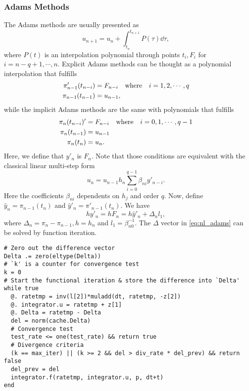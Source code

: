 \documentclass[11pt,a4paper]{article}
\begin{document}
\subsubsection{Adams Methods} \label{subsec:adams}
The Adams methods are usually presented as
\begin{equation} \label{eq:Adams_int}
  u_{n+1} = u_n + \int_{t_n}^{t_{n+1}} P(\tau) \dd{\tau},
\end{equation}
where $P(t)$ is an interpolation polynomial through points $t_i, F_i$ for
$i=n-q+1,\cdots,n$.
Explicit Adams methods can be thought as a polynomial interpolation that
fulfills
\begin{align} \label{eq:adams1}
  \pi_{n-1}'(t_{n-i})&=F_{n-i}\qq{where} i=1,2,\cdots,q \\
  \pi_{n-1}(t_{n-1})&=u_{n-1},
\end{align}
while the implicit Adams methods are the same with polynomials that fulfills
\begin{align} \label{eq:adams2}
  \pi_{n}(t_{n-i})'&=F_{n-i}\qq{where} i=0,1,\cdots,q-1 \\
  \pi_{n}(t_{n-1})&=u_{n-1} \\
  \pi_{n}(t_{n})&=u_{n}.
\end{align}
Here, we define that $y'_n$ is $F_n$. Note that those conditions are equivalent
with the classical linear multi-step form
\begin{equation}
  u_n = u_{n-1} h_n\sum_{i=0}^{q-1}\beta_{ni}y'_{n-i}.
\end{equation}
Here the coefficients $\beta_{ni}$ dependents on $h_j$ and order $q$. Now,
define $\hat{y}_n = \pi_{n-1}(t_n)$ and $\hat{y}'_n = \pi'_{n-1}(t_n)$. We have
\begin{equation} \label{eq:nl_adams}
  hy'_n = hF_n = h\hat{y}'_n + \Delta_n l_1,
\end{equation}
where $\Delta_n = \pi_n - \pi_{n-1}, h=h_n$ and $l_1 =
\beta_{n0}^{-1}$. The $\Delta$ vector in \cref{eq:nl_adams} can be solved by
function iteration.
\begin{lstlisting}
# Zero out the difference vector
Delta .= zero(eltype(Delta))
# `k' is a counter for convergence test
k = 0
# Start the functional iteration & store the difference into `Delta'
while true
  @. ratetmp = inv(l[2])*muladd(dt, ratetmp, -z[2])
  @. integrator.u = ratetmp + z[1]
  @. Delta = ratetmp - Delta
  del = norm(cache.Delta)
  # Convergence test
  test_rate <= one(test_rate) && return true
  # Divergence criteria
  (k == max_iter) || (k >= 2 && del > div_rate * del_prev) && return false
  del_prev = del
  integrator.f(ratetmp, integrator.u, p, dt+t)
end
\end{lstlisting}
\end{document}
